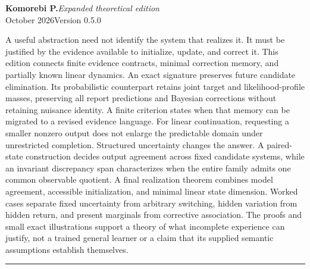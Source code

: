\documentclass[11pt,letterpaper]{article}
\theoremstyle{plain}
\theoremstyle{definition}
\begin{document}
\hypersetup{pageanchor=false}
\begin{titlepage}\thispagestyle{empty}
\vspace*{.25in}
\par
\vspace{.65in}
\vspace{.20in}
\vspace{.28in}\noindent{\color{ink}\rule{\textwidth}{.85pt}}\par
\vspace{.16in}
\noindent\textbf{Komorebi P.}\hfill\textit{Expanded theoretical edition}\\
 October 2026\hfill Version 0.5.0\par
\vspace{.46in}
\par\smallskip
\noindent A useful abstraction need not identify the system that realizes it. It must be justified by the evidence available to initialize, update, and correct it. This edition connects finite evidence contracts, minimal correction memory, and partially known linear dynamics. An exact signature preserves future candidate elimination. Its probabilistic counterpart retains joint target and likelihood-profile masses, preserving all report predictions and Bayesian corrections without retaining nuisance identity. A finite criterion states when that memory can be migrated to a revised evidence language. For linear continuation, requesting a smaller nonzero output does not enlarge the predictable domain under unrestricted completion. Structured uncertainty changes the answer. A paired-state construction decides output agreement across fixed candidate systems, while an invariant discrepancy span characterizes when the entire family admits one common observable quotient. A final realization theorem combines model agreement, accessible initialization, and minimal linear state dimension. Worked cases separate fixed uncertainty from arbitrary switching, hidden variation from hidden return, and present marginals from corrective association. The proofs and small exact illustrations support a theory of what incomplete experience can justify, not a trained general learner or a claim that its supplied semantic assumptions establish themselves.
\vfill
\noindent\rule{\textwidth}{.4pt}\par\smallskip
{}
\end{titlepage}
\hypersetup{pageanchor=true}
\begingroup\small\setlength{\parskip}{0pt}\tableofcontents\endgroup
\clearpage
\end{document}
